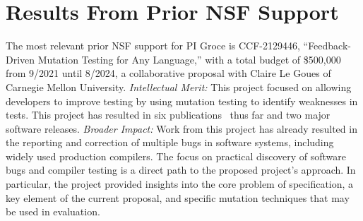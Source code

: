 \section{Results From Prior NSF Support}

The most relevant prior NSF support for PI Groce is CCF-2129446, ``Feedback-Driven Mutation Testing for Any Language,'' with a total budget of \$500,000 from 9/2021 until 8/2024,
a collaborative proposal with Claire Le Goues of Carnegie Mellon
University. \textit{Intellectual Merit:} This project
focused on allowing developers
to improve testing by using mutation testing to identify
weaknesses in tests.  This project has resulted in six
publications~\cite{cc2022,seip2022,fuzzing22,MindGap,ContextPMT,FSE24UM}
thus far and two major software releases.  \textit{
  Broader
  Impact:}  Work from this project has already
resulted in the reporting and correction of multiple bugs in software
systems, including widely used production compilers.  The focus on
practical discovery of software bugs and compiler testing is a direct
path to the proposed project's approach.  In particular, the project
provided insights into the core problem of specification, a key
element of the current proposal, and specific mutation techniques that
may be used in evaluation.
